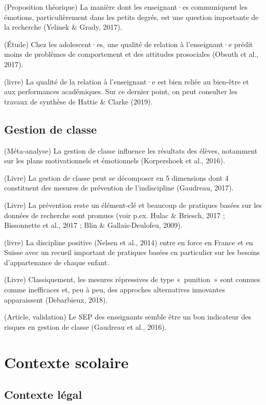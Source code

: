\documentclass[
  french,
]{article}
\begin{document}
(Proposition théorique) La manière dont les enseignant·es communiquent les émotions, particulièrement dans les petits degrés, est une question importante de la recherche (Yelinek \& Grady, 2017).

(Étude) Chez les adolescent·es, une qualité de relation à l'enseignant·e prédit moins de problèmes de comportement et des attitudes prosociales (Obsuth et al., 2017).

(livre) La qualité de la relation à l'enseignant·e est bien reliée au bien-être et aux performances académiques. Sur ce dernier point, on peut consulter les travaux de synthèse de Hattie \& Clarke (2019).

\hypertarget{gestion-de-classe}{%
\subsection{Gestion de classe}\label{gestion-de-classe}}

(Méta-analyse) La gestion de classe influence les résultats des élèves, notamment sur les plans motivationnels et émotionnels (Korpershoek et al., 2016).

(Livre) La gestion de classe peut se décomposer en 5 dimensions dont 4 constituent des mesures de prévention de l'indiscipline (Gaudreau, 2017).

(Livre) La prévention reste un élément-clé et beaucoup de pratiques basées sur les données de recherche sont promues (voir p.ex. Hulac \& Briesch, 2017 ; Bissonnette et al., 2017 ; Blin \& Gallais-Deulofeu, 2009).

(livre) La discipline positive (Nelsen et al., 2014) entre en force en France et en Suisse avec un recueil important de pratiques basées en particulier sur les besoins d'appartenance de chaque enfant.

(Livre) Classiquement, les mesures répressives de type «~punition~» sont connues comme inefficaces et, peu à peu, des approches alternatives innovantes apparaissent (Debarbieux, 2018).

(Article, validation) Le SEP des enseignants semble être un bon indicateur des risques en gestion de classe (Gaudreau et al., 2016).

\hypertarget{contexte-scolaire}{%
\section{Contexte scolaire}\label{contexte-scolaire}}

\hypertarget{contexte-luxe9gal}{%
\subsection{Contexte légal}\label{contexte-luxe9gal}}
\end{document}
